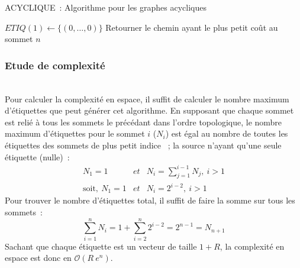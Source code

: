\documentclass[10pt,francais]{llncs}
\begin{document}
\begin{algorithm}\label{algo-acyclique}
\caption{ACYCLIQUE~: Algorithme pour les graphes acycliques}
\BlankLine
{}
\BlankLine
{}
$ETIQ(1) \leftarrow \{(0,\ldots,0)\}$\;
Retourner le chemin ayant le plus petit co\^ut au sommet $n$\;
\end{algorithm}

\subsubsection{Etude de complexit\'e}\label{sub-resol-acycl-complex}
~\\
Pour calculer la complexit\'e en espace, il suffit de calculer le nombre maximum d'\'etiquettes que peut g\'en\'erer cet algorithme. En supposant que chaque sommet est reli\'e \`a tous les sommets le pr\'ec\'edant dans l'ordre topologique, le nombre maximum d'\'etiquettes pour le sommet $i$ ($N_i$) est \'egal au nombre de toutes les \'etiquettes des sommets de plus petit indice ~; la source n'ayant qu'une seule \'etiquette (nulle)~:
$$
\begin{array}{rcl}
 N_1 = 1 & et & \displaystyle N_i = \sum_{j=1}^{i-1} N_j,\ i > 1 \\
\mathrm{soit,}\ N_1 = 1 & et & N_i = 2^{i-2},\ i > 1 
\end{array}
$$
Pour trouver le nombre d'\'etiquettes total, il suffit de faire la somme sur tous les sommets~:
$$
\displaystyle \sum_{i=1}^n N_i = \displaystyle 1 + \sum_{i=2}^n 2^{i-2} =  2^{n-1} = N_{n+1}
$$
Sachant que chaque \'etiquette est un vecteur de taille $1+R$, la complexit\'e en espace est donc en $\mathcal{O}(R\ e^n)$.
\end{document}
